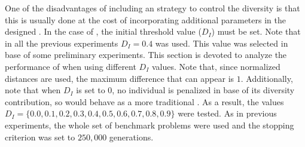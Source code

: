 One of the disadvantages of including an strategy to control the diversity is that this is usually done at the cost of
incorporating additional parameters in the designed \EA{}.
%
In the case of \VSDMOEA{}, the initial threshold value ($D_I$) must be set.
%
Note that in all the previous experiments $D_I = 0.4$ was used.
%
This value was selected in base of some preliminary experiments.
%
This section is devoted to analyze the performance of \VSDMOEA{} when using different $D_I$ values. 
%
Note that, since normalized distances are used, the maximum difference that can appear is $1$.
%
Additionally, note that when $D_I$ is set to 0, no individual is penalized in base of its diversity contribution,
so \VSDMOEA{} would behave as a more traditional \MOEA{}.
%
As a result, the values $D_I = \{0.0, 0.1, 0.2, 0.3, 0.4, 0.5, 0.6, 0.7, 0.8, 0.9\}$ were tested.
%
As in previous experiments, the whole set of benchmark problems were used and
the stopping criterion was set to $250,000$ generations.

